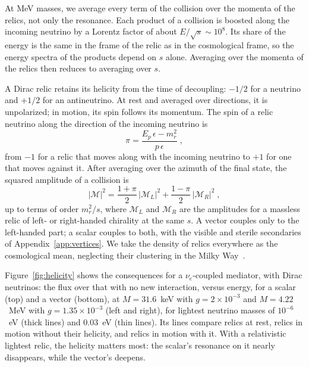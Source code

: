 \documentclass[linenumbers, aps, prd, twocolumn, superscriptaddress, floatfix, longbibliography, nofootinbib, bibnotes]{revtex4-2}
\begin{document}
At MeV masses, we average every term of the collision over the momenta of the relics, not only the resonance.
Each product of a collision is boosted along the incoming neutrino by a Lorentz factor of about $E/\sqrt{s} \sim 10^8$.
Its share of the energy is the same in the frame of the relic as in the cosmological frame, so the energy spectra of the products depend on $s$ alone.
Averaging over the momenta of the relics then reduces to averaging over $s$.

A Dirac relic retains its helicity from the time of decoupling: $-1/2$ for a neutrino and $+1/2$ for an antineutrino.
At rest and averaged over directions, it is unpolarized; in motion, its spin follows its momentum.
The spin of a relic neutrino along the direction of the incoming neutrino is
\begin{equation}
 \label{equ:polarization}
 \pi = \frac{E_p\, \epsilon - m_r^2}{p\, \epsilon} \;,
\end{equation}
from $-1$ for a relic that moves along with the incoming neutrino to $+1$ for one that moves against it.
After averaging over the azimuth of the final state, the squared amplitude of a collision is
\begin{equation}
 \label{equ:helicity_mix}
 |\mathcal{M}|^2 = \frac{1 + \pi}{2}\, |\mathcal{M}_L|^2 + \frac{1 - \pi}{2}\, |\mathcal{M}_R|^2 \;,
\end{equation}
up to terms of order $m_r^2/s$, where $\mathcal{M}_L$ and $\mathcal{M}_R$ are the amplitudes for a massless relic of left- or right-handed chirality at the same $s$.
A vector couples only to the left-handed part; a scalar couples to both, with the visible and sterile secondaries of Appendix~\ref{app:vertices}.
We take the density of relics everywhere as the cosmological mean, neglecting their clustering in the Milky Way~\cite{Ringwald:2004np, deSalas:2017wtt, Mertsch:2019qjv}.

Figure~\ref{fig:helicity} shows the consequences for a $\nu_e$-coupled mediator, with Dirac neutrinos: the flux over that with no new interaction, versus energy, for a scalar (top) and a vector (bottom), at $M = 31.6$~keV with $g = 2 \times 10^{-3}$ and $M = 4.22$~MeV with $g = 1.35 \times 10^{-3}$ (left and right), for lightest neutrino masses of $10^{-6}$~eV (thick lines) and 0.03~eV (thin lines).
Its lines compare relics at rest, relics in motion without their helicity, and relics in motion with it.
With a relativistic lightest relic, the helicity matters most: the scalar's resonance on it nearly disappears, while the vector's deepens.
\end{document}
